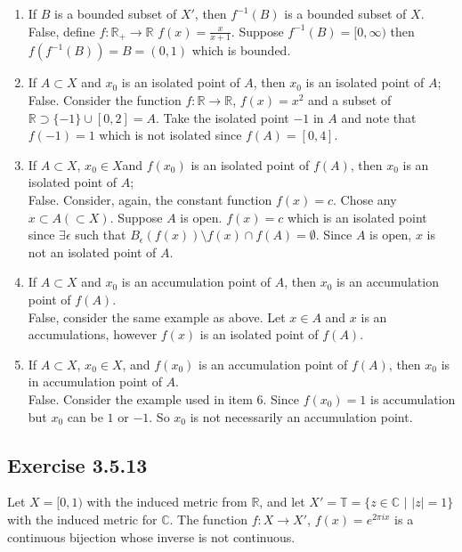 \documentclass{tufte-book}
\theoremstyle{mytheoremstyle}
\theoremstyle{mylemstyle}
\theoremstyle{mydefstyle}
\begin{document}
\begin{enumerate}
\item If $B$ is a bounded subset of $X'$, then $f^{-1}(B)$ is a bounded subset of $X$.\\
False, define $f: \mathbb{R}_+ \to \mathbb{R}$ $f(x) = \frac{x}{x+1}$. Suppose $f^{-1}(B) = [0, \infty)$ then $f(f^{-1}(B)) = B = (0,1)$ which is bounded.

\item If $A \subset X$ and $x_0$ is an isolated point of $A$, then $x_0$ is an isolated point of $A$;\\
False.  Consider the function $f: \mathbb{R} \to \mathbb{R}$, $f(x) = x^2$ and a subset of $\mathbb{R} \supset \{-1\} \cup [0,2]= A$.  Take the isolated point $-1$ in $A$ and note that $f(-1) = 1$ which is not isolated since $f(A) = [0,4]$.

\item If $A \subset X$, $x_0 \in X$and $f(x_0)$ is an isolated point of $f(A)$, then $x_0$ is an isolated point of $A$;\\
False.  Consider, again, the constant function $f(x) = c$.  Chose any $x \subset A (\subset X)$.  Suppose $A$ is open.  $f(x) = c$ which is an isolated point since $\exists\epsilon$ such that $B_\epsilon(f(x)) \setminus f(x) \cap f(A) = \emptyset$.  Since $A$ is open, $x$ is not an isolated point of $A$.

\item If $A \subset X$ and $x_0$ is an accumulation point of $A$, then $x_0$ is an accumulation point of $f(A)$.\\
False, consider the same example as above.  Let $x \in A$ and $x$ is an accumulations, however $f(x)$ is an isolated point of $f(A)$.

\item If $A \subset X$, $x_0 \in X$, and $f(x_0)$ is an accumulation point of $f(A)$, then $x_0$ is in accumulation point of $A$.\\
False.  Consider the example used in item $6$.  Since $f(x_0) = 1$ is accumulation but $x_0$ can be $1$ or $-1$.  So $x_0$ is not necessarily an accumulation point.

\end{enumerate}

\subsection{Exercise 3.5.13}
Let $X = [0,1)$ with the induced metric from $\mathbb{R}$, and let $X' = \mathbb{T} = \{z \in \mathbb{C}\text{ | } |z| = 1 \}$ with the induced metric for $\mathbb{C}$. The function $f : X \to X'$, $f(x) = e^{2\pi i x}$ is a continuous bijection whose inverse is not continuous.
\end{document}
